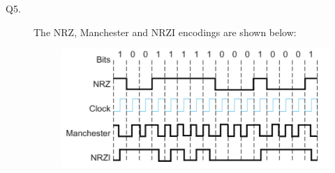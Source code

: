 \documentclass{csc_assignment}
\begin{document}
\begin{description}

\item[Q5.]
The NRZ, Manchester and NRZI encodings are shown below: 
\begin{figure}[h]
\includegraphics[scale=0.75]{358.png}
\vspace{-50mm}
\end{figure}


\end{description}
\end{document}

